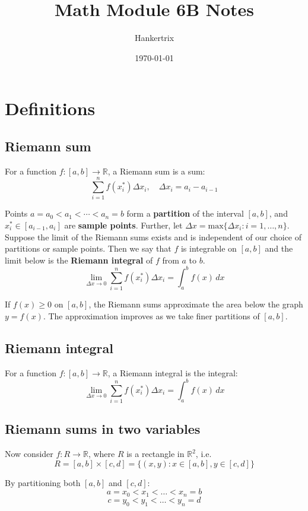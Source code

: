 \documentclass[11pt]{article}
\author{Hankertrix}
\date{\today}
\title{Math Module 6B Notes}
\begin{document}
\maketitle
\setcounter{tocdepth}{2}
\tableofcontents \clearpage\section{Definitions}
\label{sec:orgf221bac}

\subsection{Riemann sum}
\label{sec:orga08c251}
For a function \(f : [a, b] \rightarrow \mathbb{R}\), a Riemann sum is a sum:
\[\sum_{i = 1}^n f(x_i^*) \Delta x_i, \quad \Delta x_i = a_i - a_{i - 1}\]

Points \(a = a_0 < a_1 < \cdots < a_n = b\) form a \textbf{partition} of the interval \([a, b]\), and \(x_i^* \in [a_{i - 1}, a_i]\) are \textbf{sample points}. Further, let \(\Delta x = \text{max} \{\Delta x_i : i = 1, \ldots, n\}\). Suppose the limit of the Riemann sums exists and is independent of our choice of partitions or sample points. Then we say that \(f\) is integrable on \([a, b]\) and the limit below is the \textbf{Riemann integral} of \(f\) from \(a\) to \(b\).
\[\lim_{\Delta x \rightarrow 0} \sum_{i = 1}^n f(x_i^*) \Delta x_i = \int_a^b f(x) \, dx\]

If \(f(x) \ge 0\) on \([a, b]\), the Riemann sums approximate the area below the graph \(y = f(x)\). The approximation improves as we take finer partitions of \([a, b]\).
\subsection{Riemann integral}
\label{sec:org98dcb64}
For a function \(f : [a, b] \rightarrow \mathbb{R}\), a Riemann integral is the integral:
\[\lim_{\Delta x \rightarrow 0} \sum_{i = 1}^n f(x_i^*) \Delta x_i = \int_a^b f(x) \, dx\]

\newpage
\subsection{Riemann sums in two variables}
\label{sec:org2939ed0}
Now consider \(f : R \rightarrow \mathbb{R}\), where \(R\) is a rectangle in \(\mathbb{R}^2\), i.e.
\[R = [a, b] \times [c, d] = \{(x, y) : x \in [a, b], y \in [c, d]\}\]

By partitioning both \([a, b]\) and \([c, d]\):
\[a = x_0 < x_1 < \ldots < x_n = b\]
\[c = y_0 < y_1 < \ldots < y_n = d\]
\end{document}
